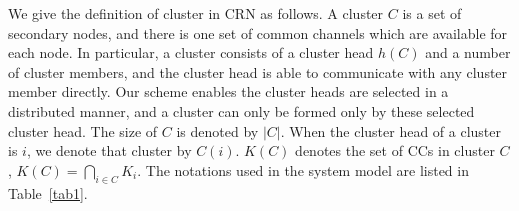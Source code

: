 \documentclass[times]{ettauth}
\theoremstyle{mytheoremstyle}
\theoremstyle{mytheoremstyle}
\theoremstyle{mytheoremstyle}
\begin{document}
We give the definition of cluster in CRN as follows. 
A cluster $C$ is a set of secondary nodes, and there is one set of common channels which are available for each node.
In particular, a cluster consists of a cluster head $h(C)$ and a number of cluster members, and the cluster head is able to communicate with any cluster member directly.
Our scheme enables the cluster heads are selected in a distributed manner, and a cluster can only be formed only by these selected cluster head.
The size of $C$ is denoted by $|C|$.
When the cluster head of a cluster is $i$, we denote that cluster by $C(i)$.
$K(C)$ denotes the set of CCs in cluster $C$, $ K(C) = \bigcap_{i\in C} K_i$.
The notations used in the system model are listed in Table~\ref{tab1}.
\end{document}
